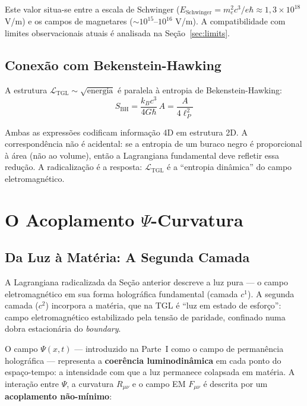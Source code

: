 \documentclass[12pt,a4paper,twoside]{article}
\newcommand{\Ltgl}{\mathcal{L}_{\text{TGL}}}
\newcommand{\Psifield}{\Psi}
\newcommand{\boundary}{\textit{boundary}}
\begin{document}
\noindent Este valor situa-se entre a escala de Schwinger ($E_{\text{Schwinger}} = m_e^2 c^3 / e\hbar \approx 1{,}3 \times 10^{18}$ V/m) e os campos de magnetares ($\sim 10^{15}$--$10^{16}$ V/m). A compatibilidade com limites observacionais atuais \'e analisada na Se\c{c}\~ao~\ref{sec:limits}.


\subsection{Conex\~ao com Bekenstein-Hawking}

A estrutura $\Ltgl \sim \sqrt{\text{energia}}$ \'e paralela \`a entropia de Bekenstein-Hawking:
\begin{equation}
S_{\text{BH}} = \frac{k_B c^3}{4G\hbar}\, A = \frac{A}{4\ell_P^2}
\label{eq:bekenstein}
\end{equation}

Ambas as express\~oes codificam informa\c{c}\~ao 4D em estrutura 2D. A correspond\^encia n\~ao \'e acidental: se a entropia de um buraco negro \'e proporcional \`a \'area (n\~ao ao volume), ent\~ao a Lagrangiana fundamental deve refletir essa redu\c{c}\~ao. A radicaliza\c{c}\~ao \'e a resposta: $\Ltgl$ \'e a ``entropia din\^amica'' do campo eletromagn\'etico.


\section{O Acoplamento $\Psifield$-Curvatura}


\subsection{Da Luz \`a Mat\'eria: A Segunda Camada}

A Lagrangiana radicalizada da Se\c{c}\~ao anterior descreve a luz pura --- o campo eletromagn\'etico em sua forma hologr\'afica fundamental (camada $c^1$). A segunda camada ($c^2$) incorpora a mat\'eria, que na TGL \'e ``luz em estado de esfor\c{c}o'': campo eletromagn\'etico estabilizado pela tens\~ao de paridade, confinado numa dobra estacion\'aria do \boundary.



O campo $\Psifield(x,t)$ --- introduzido na Parte~I como o campo de perman\^encia hologr\'afica --- representa a \textbf{coer\^encia luminodin\^amica} em cada ponto do espa\c{c}o-tempo: a intensidade com que a luz permanece colapsada em mat\'eria. A intera\c{c}\~ao entre $\Psifield$, a curvatura $R_{\mu\nu}$ e o campo EM $F_{\mu\nu}$ \'e descrita por um \textbf{acoplamento n\~ao-m\'inimo}:
\end{document}
